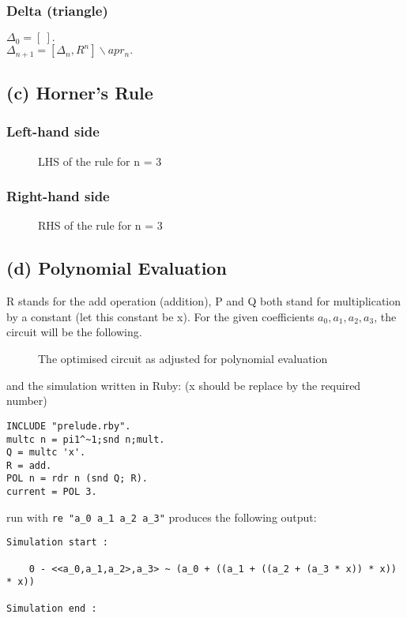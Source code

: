 \documentclass[a4paper,10pt]{article}
\begin{document}
\subsubsection*{Delta (triangle)}
$\Delta_0 = [\: ].$ \\[0.25cm]
$\Delta_{n+1} = [\Delta_{n},R^n]\backslash apr_n.$
\subsection*{(c) Horner's Rule}
\subsubsection*{Left-hand side}
\begin{figure}[H]
\begin{center}

\caption{LHS of the rule for n = 3}
\end{center}
\end{figure}
\subsubsection*{Right-hand side}
\begin{figure}[H]
\begin{center}

\caption{RHS of the rule for n = 3}
\end{center}
\end{figure}
\subsection*{(d) Polynomial Evaluation}
R stands for the add operation (addition), P and Q both stand for multiplication by a constant (let this constant be x).
For the given coefficients $a_0,a_1,a_2,a_3$, the circuit will be the following.
\begin{figure}[H]
\begin{center}

\caption{The optimised circuit as adjusted for polynomial evaluation}
\end{center}
\end{figure}
and the simulation written in Ruby: (x should be replace by the required number)
\begin{Verbatim}
INCLUDE "prelude.rby".
multc n = pi1^~1;snd n;mult.
Q = multc 'x'.
R = add.
POL n = rdr n (snd Q; R).
current = POL 3.
\end{Verbatim}
run with \verb|re "a_0 a_1 a_2 a_3"| produces the following output:
\begin{Verbatim}
Simulation start :

    0 - <<a_0,a_1,a_2>,a_3> ~ (a_0 + ((a_1 + ((a_2 + (a_3 * x)) * x)) * x))

Simulation end :
\end{Verbatim}
\end{document}
